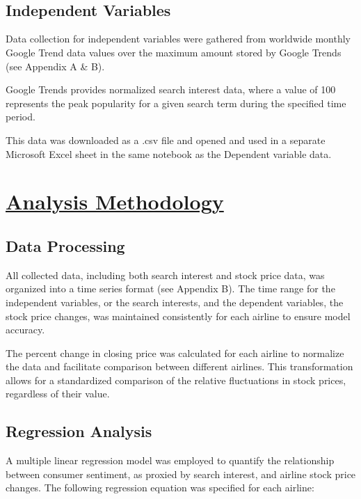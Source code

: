\documentclass[12pt]{report}
\begin{document}
\\ \\
\subsection*{Independent Variables}
Data collection for independent variables were gathered from worldwide monthly Google Trend data values over the maximum amount stored by Google Trends (see Appendix A & B).

Google Trends provides normalized search interest data, where a value of
100 represents the peak popularity for a given search term during the specified
time period.


This data was downloaded as a .csv file and opened and used in a separate Microsoft Excel sheet in the same notebook as the Dependent variable data.


\section*{\underline{Analysis Methodology}}
\subsection*{Data Processing}


All collected data, including both search interest and stock
price data, was organized into a time series format (see Appendix B). The time range for the
independent variables, or the search interests, and the dependent variables,
the stock price changes, was maintained consistently for each airline to ensure
model accuracy.

\par


The percent change in closing price was calculated for each airline
to normalize the data and facilitate comparison between different airlines.
This transformation allows for a standardized comparison of the relative
fluctuations in stock prices, regardless of their value.


\subsection*{Regression Analysis}


A multiple linear regression model was employed to quantify
the relationship between consumer sentiment, as proxied by search interest, and
airline stock price changes. The following regression equation was specified
for each airline:
\end{document}
